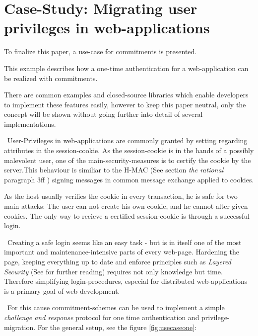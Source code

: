 
\section{Case-Study: Migrating user privileges in web-applications}
\label{sec:casestudy}
To finalize this paper, a use-case for commitments is presented. 

This example describes how a one-time authentication for a web-application can be realized with commitments. 

There are common examples and closed-source libraries which enable developers to implement these features easily, however to keep this paper neutral, only the concept will be shown without going further into detail of several implementations. 

~\newline User-Privileges in web-applications are commonly granted by setting regarding attributes in the session-cookie. As the session-cookie is in the hands of a possibly malevolent user, one of the main-security-measures is to certify the cookie by the server.This behaviour is similiar to the H-MAC (See \cite{BeCaKra96} section \textit{the rational} paragraph 3ff ) signing messages in common message exchange applied to cookies. 

As the host usually verifies the cookie in every transaction, he is safe for two main attacks: The user can not create his own cookie, and he cannot alter given cookies. The only way to recieve a certified session-cookie is through a successful login.

~\newline Creating a safe login seems like an easy task - but is in itself one of the most important and maintenance-intensive parts of every web-page. Hardening the page, keeping everything up to date and enforce principles such as \textit{Layered Security} (See \cite{Den12} for further reading) requires not only knowledge but time. Therefore simplifying login-procedures, especial for distributed web-applications is a primary goal of web-development. 

~\newline For this cause commitment-schemes can be used to implement a simple \textit{challenge and response} protocol for one time authentication and privilege-migration. For the general setup, see the figure \ref{fig:usecaseone}: 

